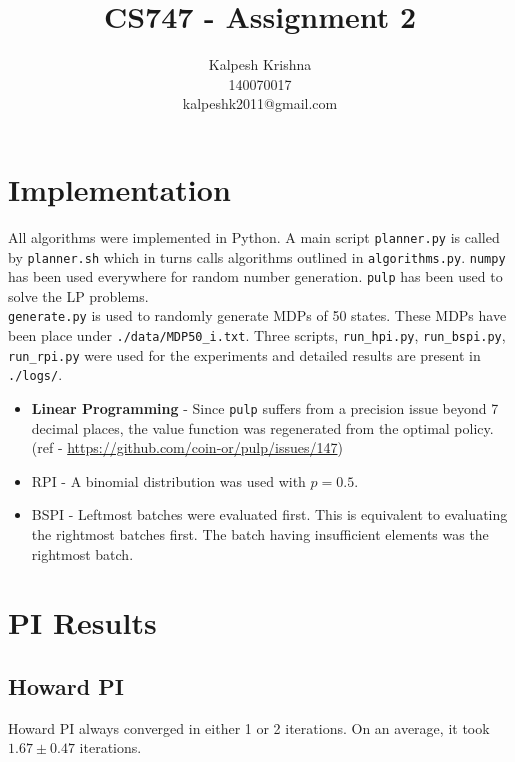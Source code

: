 \documentclass[11pt]{article}
\title{\textbf{CS747 - Assignment 2}}
\author{Kalpesh Krishna\\140070017\\kalpeshk2011@gmail.com}
\date{}
\begin{document}
\maketitle

\section{Implementation}
All algorithms were implemented in Python. A main script \texttt{planner.py} is called by \texttt{planner.sh} which in turns calls algorithms outlined in \texttt{algorithms.py}. \texttt{numpy} has been used everywhere for random number generation. \texttt{pulp} has been used to solve the LP problems.\\
\texttt{generate.py} is used to randomly generate MDPs of 50 states. These MDPs have been place under \texttt{./data/MDP50\_i.txt}. Three scripts, \texttt{run\_hpi.py}, \texttt{run\_bspi.py}, \texttt{run\_rpi.py} were used for the experiments and detailed results are present in \texttt{./logs/}.
\begin{itemize}
\item \textbf{Linear Programming} - Since \texttt{pulp} suffers from a precision issue beyond 7 decimal places, the value function was regenerated from the optimal policy. (ref - \url{https://github.com/coin-or/pulp/issues/147})
\item {RPI} - A binomial distribution was used with $p = 0.5$.
\item {BSPI} - Leftmost batches were evaluated first. This is equivalent to evaluating the rightmost batches first. The batch having insufficient elements was the rightmost batch.
\end{itemize}
\section{PI Results}
\subsection{Howard PI}
Howard PI always converged in either 1 or 2 iterations. On an average, it took $1.67 \pm 0.47$ iterations.
\end{document}
